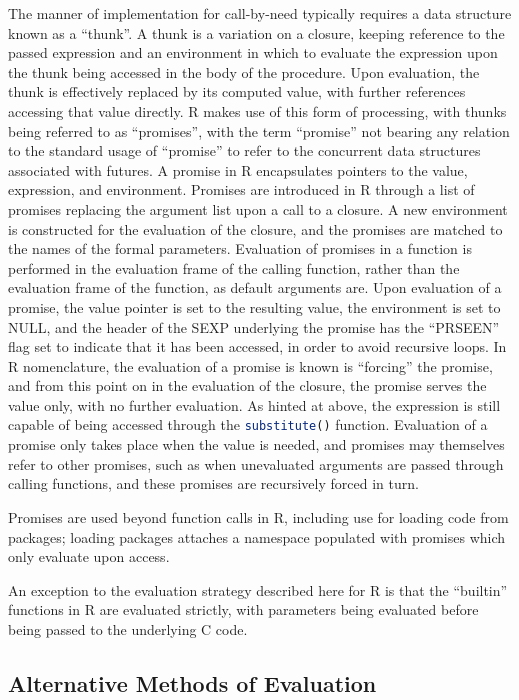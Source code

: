 The manner of implementation for call-by-need typically requires a data structure known as a ``thunk''\cite{ingerman1961thunks}.
A thunk is a variation on a closure, keeping reference to the passed expression and an environment in which to evaluate the expression upon the thunk being accessed in the body of the procedure.
Upon evaluation, the thunk is effectively replaced by its computed value, with further references accessing that value directly.
R makes use of this form of processing, with thunks being referred to as ``promises'', with the term ``promise'' not bearing any relation to the standard usage of ``promise'' to refer to the concurrent data structures associated with futures\cite{rcore2020lang:promise}.
A promise in R encapsulates pointers to the value, expression, and environment.
Promises are introduced in R through a list of promises replacing the argument list upon a call to a closure.
A new environment is constructed for the evaluation of the closure, and the promises are matched to the names of the formal parameters.
Evaluation of promises in a function is performed in the evaluation frame of the calling function, rather than the evaluation frame of the function, as default arguments are.
Upon evaluation of a promise, the value pointer is set to the resulting value, the environment is set to NULL, and the header of the SEXP underlying the promise has the ``PRSEEN'' flag set to indicate that it has been accessed, in order to avoid recursive loops.
In R nomenclature, the evaluation of a promise is known is ``forcing'' the promise, and from this point on in the evaluation of the closure, the promise serves the value only, with no further evaluation.
As hinted at above, the expression is still capable of being accessed through the \lstinline[language=R]{substitute()} function.
Evaluation of a promise only takes place when the value is needed, and promises may themselves refer to other promises, such as when unevaluated arguments are passed through calling functions, and these promises are recursively forced in turn.

Promises are used beyond function calls in R, including use for loading code from packages; loading packages attaches a namespace populated with promises which only evaluate upon access.

An exception to the evaluation strategy described here for R is that the ``builtin'' functions in R are evaluated strictly, with parameters being evaluated before being passed to the underlying C code.

\subsection{Alternative Methods of Evaluation}

